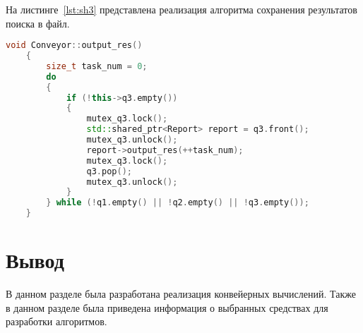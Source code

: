 На листинге~\ref{lst:sh3} представлена реализация алгоритма сохранения результатов поиска в файл.
\begin{lstlisting}[label=lst:sh3,caption=Реализация вспомогательного потока, отвечающего за сохранение результатов в файл, language=C++]
	void Conveyor::output_res()
	{
		size_t task_num = 0;
		do
		{
			if (!this->q3.empty())
			{
				mutex_q3.lock();
				std::shared_ptr<Report> report = q3.front();
				mutex_q3.unlock();
				report->output_res(++task_num);
				mutex_q3.lock();
				q3.pop();
				mutex_q3.unlock();
			}
		} while (!q1.empty() || !q2.empty() || !q3.empty());
	}   
\end{lstlisting}

\section*{Вывод}

В данном разделе была разработана реализация конвейерных вычислений.
Также в данном разделе была приведена информация о выбранных средствах для разработки алгоритмов.